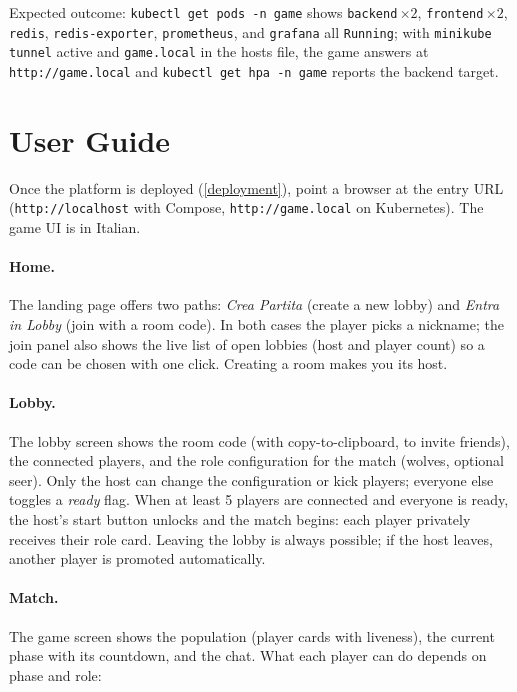 \documentclass{scrartcl}
\begin{document}
Expected outcome: \texttt{kubectl get pods -n game} shows
\texttt{backend}\,$\times2$, \texttt{frontend}\,$\times2$,
\texttt{redis}, \texttt{redis-exporter}, \texttt{prometheus}, and
\texttt{grafana} all \texttt{Running}; with \texttt{minikube tunnel}
active and \texttt{game.local} in the hosts file, the game answers at
\texttt{http://game.local} and \texttt{kubectl get hpa -n game} reports
the backend target.

\section{User Guide}\label{user-guide}

Once the platform is deployed (\cref{deployment}), point a browser at the
entry URL (\texttt{http://localhost} with Compose,
\texttt{http://game.local} on Kubernetes). The game UI is in Italian.

\paragraph{Home.}
The landing page offers two paths: \emph{Crea Partita} (create a new
lobby) and \emph{Entra in Lobby} (join with a room code). In both cases
the player picks a nickname; the join panel also shows the live list of
open lobbies (host and player count) so a code can be chosen with one
click. Creating a room makes you its host.

\paragraph{Lobby.}
The lobby screen shows the room code (with copy-to-clipboard, to invite
friends), the connected players, and the role configuration for the
match (wolves, optional seer). Only the host can change the
configuration or kick players; everyone else toggles a \emph{ready}
flag. When at least 5 players are connected and everyone is ready, the
host's start button unlocks and the match begins: each player privately
receives their role card. Leaving the lobby is always possible; if the
host leaves, another player is promoted automatically.

\paragraph{Match.}
The game screen shows the population (player cards with liveness), the
current phase with its countdown, and the chat. What each player can do
depends on phase and role:
\end{document}
